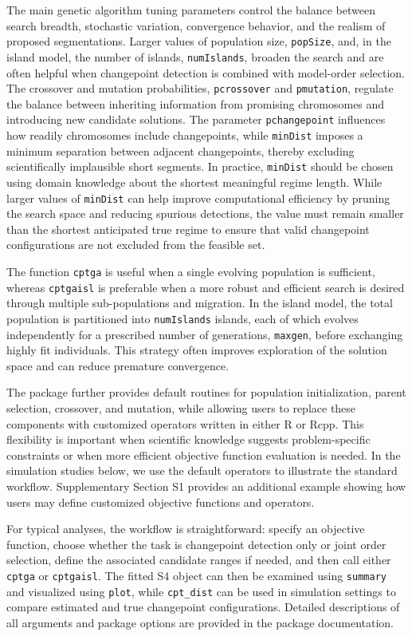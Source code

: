 The main genetic algorithm tuning parameters control the balance between search breadth, stochastic variation, convergence behavior, and the realism of proposed segmentations. Larger values of population size, \texttt{popSize}, and, in the island model, the number of islands, \texttt{numIslands}, broaden the search and are often helpful when changepoint detection is combined with model-order selection. The crossover and mutation probabilities, \texttt{pcrossover} and \texttt{pmutation}, regulate the balance between inheriting information from promising chromosomes and introducing new candidate solutions. The parameter \texttt{pchangepoint} influences how readily chromosomes include changepoints, while \texttt{minDist} imposes a minimum separation between adjacent changepoints, thereby excluding scientifically implausible short segments. In practice, \texttt{minDist} should be chosen using domain knowledge about the shortest meaningful regime length. While larger values of \texttt{minDist} can help improve computational efficiency by pruning the search space and reducing spurious detections, the value must remain smaller than the shortest anticipated true regime to ensure that valid changepoint configurations are not excluded from the feasible set.

The function \texttt{cptga} is useful when a single evolving population is sufficient, whereas \texttt{cptgaisl} is preferable when a more robust and efficient search is desired through multiple sub-populations and migration. In the island model, the total population is partitioned into \texttt{numIslands} islands, each of which evolves independently for a prescribed number of generations, \texttt{maxgen}, before exchanging highly fit individuals. This strategy often improves exploration of the solution space and can reduce premature convergence.

The package further provides default routines for population initialization, parent selection, crossover, and mutation, while allowing users to replace these components with customized operators written in either R or Rcpp. This flexibility is important when scientific knowledge suggests problem-specific constraints or when more efficient objective function evaluation is needed. In the simulation studies below, we use the default operators to illustrate the standard workflow. Supplementary Section S1 provides an additional example showing how users may define customized objective functions and operators.

For typical analyses, the workflow is straightforward: specify an objective function, choose whether the task is changepoint detection only or joint order selection, define the associated candidate ranges if needed, and then call either \texttt{cptga} or \texttt{cptgaisl}. The fitted S4 object can then be examined using \texttt{summary} and visualized using \texttt{plot}, while \texttt{cpt\_dist} can be used in simulation settings to compare estimated and true changepoint configurations. Detailed descriptions of all arguments and package options are provided in the package documentation.

